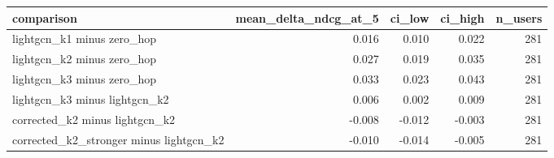 \begin{tabular}{lrrrr}
\toprule
comparison & mean_delta_ndcg_at_5 & ci_low & ci_high & n_users \\
\midrule
lightgcn_k1 minus zero_hop & 0.016 & 0.010 & 0.022 & 281 \\
lightgcn_k2 minus zero_hop & 0.027 & 0.019 & 0.035 & 281 \\
lightgcn_k3 minus zero_hop & 0.033 & 0.023 & 0.043 & 281 \\
lightgcn_k3 minus lightgcn_k2 & 0.006 & 0.002 & 0.009 & 281 \\
corrected_k2 minus lightgcn_k2 & -0.008 & -0.012 & -0.003 & 281 \\
corrected_k2_stronger minus lightgcn_k2 & -0.010 & -0.014 & -0.005 & 281 \\
\bottomrule
\end{tabular}
